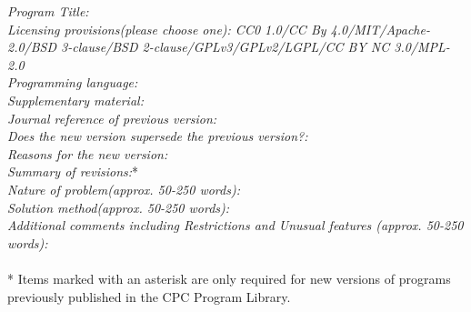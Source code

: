 \documentclass[preprint,12pt]{elsarticle}
\begin{document}
\begin{small}
\noindent
{\em Program Title:}                                          \\
{\em Licensing provisions(please choose one): CC0 1.0/CC By 4.0/MIT/Apache-2.0/BSD 3-clause/BSD 2-clause/GPLv3/GPLv2/LGPL/CC BY NC 3.0/MPL-2.0 }                                   \\
{\em Programming language:}                                   \\

{\em Supplementary material:}                                 \\
{\em Journal reference of previous version:}                  \\
{\em Does the new version supersede the previous version?:}   \\
{\em Reasons for the new version:}\\
{\em Summary of revisions:}*\\

{\em Nature of problem(approx. 50-250 words):}\\
{\em Solution method(approx. 50-250 words):}\\
{\em Additional comments including Restrictions and Unusual features (approx. 50-250 words):}\\
   \\

* Items marked with an asterisk are only required for new versions
of programs previously published in the CPC Program Library.\\
\end{small}
\end{document}
